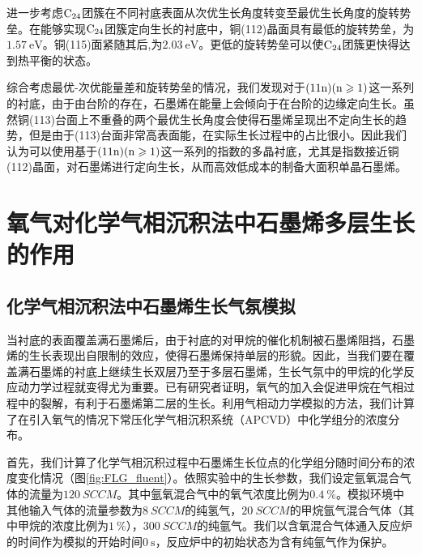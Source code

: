 进一步考虑$\rm{C_{24}}$团簇在不同衬底表面从次优生长角度转变至最优生长角度的旋转势垒。在能够实现$\rm{C_{24}}$团簇定向生长的衬底中，铜(112)晶面具有最低的旋转势垒，为$\SI{1.57 }{\electronvolt}$。铜(115)面紧随其后,为$\SI{2.03 }{\electronvolt}$。更低的旋转势垒可以使$\rm{C_{24}}$团簇更快得达到热平衡的状态。

综合考虑最优-次优能量差和旋转势垒的情况，我们发现对于$\rm{(11n)(n \geqslant 1)}$这一系列的衬底，由于由台阶的存在，石墨烯在能量上会倾向于在台阶的边缘定向生长。虽然铜(113)台面上不重叠的两个最优生长角度会使得石墨烯呈现出不定向生长的趋势，但是由于(113)台面非常高表面能，在实际生长过程中的占比很小。因此我们认为可以使用基于$\rm{(11n)(n \geqslant 1)}$这一系列的指数的多晶衬底，尤其是指数接近铜(112)晶面，对石墨烯进行定向生长，从而高效低成本的制备大面积单晶石墨烯。

\section{氧气对化学气相沉积法中石墨烯多层生长的作用}
\label{sec:石墨烯氧蚀刻穿透}
\def\muO#1{\it \mu_{\rm O}^{\rm #1} \it}
\def\halfEOm{\it \frac{1}{2}E_{\rm \cemb{O2}} \it}
\def\EOa{\it E_{\rm O} \it }
\def\Cdis{\rm{\left[C_{dis.}\right]} \it }
\def\Oads{\rm{\left[O_{ads.}\right]} \it }
\def\RateV#1#2{\it \nu_{\rm #1}^{\rm #2} \it }
\def\RateK#1#2{\it{k_{\rm #1}^{\rm #2}} \it }
\def\ReactTime#1#2{\it{t_{\rm #1}^{\rm #2}} \it }

\subsection{化学气相沉积法中石墨烯生长气氛模拟}
\label{subsec:FLG_gasPhase}
当衬底的表面覆盖满石墨烯后，由于衬底的对甲烷的催化机制被石墨烯阻挡，石墨烯的生长表现出自限制的效应，使得石墨烯保持单层的形貌。因此，当我们要在覆盖满石墨烯的衬底上继续生长双层乃至于多层石墨烯，生长气氛中的甲烷的化学反应动力学过程就变得尤为重要。已有研究者证明，氧气的加入会促进甲烷在气相过程中的裂解，有利于石墨烯第二层的生长。利用气相动力学模拟的方法，我们计算了在引入氧气的情况下常压化学气相沉积系统（APCVD）中化学组分的浓度分布。

首先，我们计算了化学气相沉积过程中石墨烯生长位点的化学组分随时间分布的浓度变化情况（图\ref{fig:FLG_fluent}）。依照实验中的生长参数，我们设定氩氧混合气体的流量为$\SI{120}{SCCM}$。其中氩氧混合气中的氧气浓度比例为$\SI{0.4}{\percent}$。模拟环境中其他输入气体的流量参数为$\SI{8}{SCCM}$的纯氢气，$\SI{20}{SCCM}$的甲烷氩气混合气体（其中甲烷的浓度比例为$\SI{1}{\percent}$），$\SI{300}{SCCM}$的纯氩气。我们以含氧混合气体通入反应炉的时间作为模拟的开始时间$\SI{0}{\second}$，反应炉中的初始状态为含有纯氩气作为保护。

